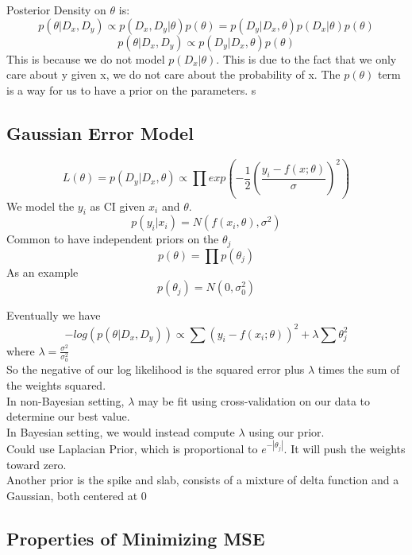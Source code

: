\documentclass[11pt,psfig]{article}
\begin{document}
Posterior Density on $\theta$ is: 
\[
p(\theta|D_x,D_y) \propto p(D_x,D_y|\theta)p(\theta) = p(D_y|D_x,\theta)p(D_x|\theta)p(\theta)
\]
\[
p(\theta|D_x,D_y) \propto p(D_y|D_x,\theta)p(\theta)
\]
This is because we do not model $p(D_x|\theta)$. This is due to the fact that we only care about y given x, we do not care about the probability of x. The $p(\theta)$ term is a way for us to have a prior on the parameters. s

\subsection*{Gaussian Error Model}

\[
L(\theta) = p(D_y|D_x,\theta) \propto \prod{exp(-\frac{1}{2}(\frac{y_i-f(x;\theta)}{\sigma})^2)}
\]
We model the $y_i$ as CI given $x_i$ and $\theta$. 
\[
p(y_i|x_i) = N( f(x_i,\theta), \sigma^2)
\]
Common to have independent priors on the $\theta_j$
\[
p(\theta) = \prod{p(\theta_j)}
\]
As an example
\[
p(\theta_j) = N(0,\sigma_0^2)
\]

Eventually we have
\[
-log(p(\theta|D_x,D_y)) \propto \sum{(y_i - f(x_i;\theta))^2} + \lambda \sum{\theta_j^2}
\]
where $\lambda = \frac{\sigma^2}{\sigma_0^2}$\\
So the negative of our log likelihood is the squared error plus $\lambda$ times the sum of the weights squared. \\
In non-Bayesian setting, $\lambda$ may be fit using cross-validation on our data to determine our best value. 
\\
In Bayesian setting, we would instead compute $\lambda$ using our prior. 
\\
Could use Laplacian Prior, which is proportional to $e^{-|\theta_j|}$. It will push the weights toward zero.\\
Another prior is the spike and slab, consists of a mixture of delta function and a Gaussian, both centered at 0

\subsection*{Properties of Minimizing MSE}
\end{document}
